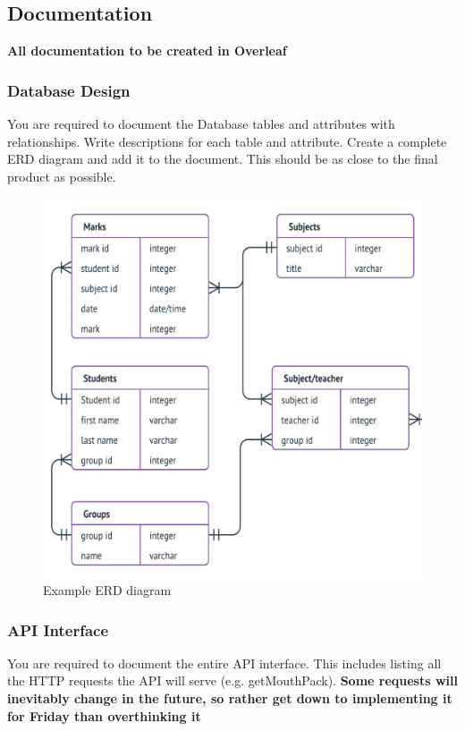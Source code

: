 \documentclass{article}
\begin{document}
\subsection{Documentation}
\textbf{All documentation to be created in Overleaf}

\subsubsection{Database Design}
You are required to document the Database tables and attributes with relationships. Write descriptions for each table and attribute. Create a complete ERD diagram and add it to the document. This should be as close to the final product as possible.

\begin{figure}[h]
    \centering
    \includegraphics[width=\textwidth]{erd.png}
    \caption{Example ERD diagram}
\end{figure}

\newpage

\subsubsection{API Interface}
You are required to document the entire API interface. This includes listing all the HTTP requests the API will serve (e.g. getMouthPack). \textbf{Some requests will inevitably change in the future, so rather get down to implementing it for Friday than overthinking it}\\
\end{document}
